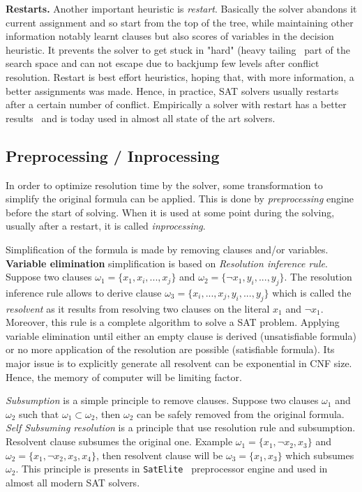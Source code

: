 \textbf{Restarts.}
Another important heuristic is \emph{restart}. Basically the solver abandons it current assignment and so 
start from the top of the tree, while maintaining other information notably learnt clauses but also scores of variables in the decision heuristic. It prevents the solver to get stuck in "hard" (heavy tailing~\cite{gomes1997heavy} part of the search space and can not escape due to backjump few levels after conflict resolution. Restart is best effort heuristics, hoping that,
with more information, a better assignments was made. Hence, in practice, SAT solvers usually restarts after a
certain number of conflict. Empirically a solver with restart has a better results~\cite{huang2007effect} and is today
used in almost all state of the art solvers.


\subsection{Preprocessing / Inprocessing}

In order to optimize resolution time by the solver, some transformation to simplify the original formula can be applied. This is done by \emph{preprocessing} engine before the start of solving. When it is used at some point during the solving, usually after a restart, it is called \emph{inprocessing}.

Simplification of the formula is made by removing clauses and/or variables.\\
\textbf{Variable elimination} simplification is based on \emph{Resolution inference rule}.
Suppose two clauses	$\omega_1 = \{x_1, x_i, ..., x_j \}$ and $\omega_2 = \{\neg x_1, y_i, ..., y_j\}$.
The resolution inference rule allows to derive clause $\omega_3 = \{x_i, ..., x_j, y_i, ..., y_j\}$ which is called
the \emph{resolvent} as it results from resolving two clauses on the literal $x_1$ and $\neg x_1$.
Moreover, this rule is a complete algorithm to solve a SAT problem. Applying variable elimination until either an empty clause is derived (unsatisfiable formula) or no more application of the resolution are
possible (satisfiable formula). Its major issue is to explicitly generate all resolvent can be exponential in CNF size. Hence, the memory of computer will be limiting factor.


\emph{Subsumption} is a simple principle to remove clauses. Suppose two clauses $\omega_1$ and $\omega_2$ such that
$\omega_1 \subset  \omega_2$, then $\omega_2$ can be safely removed from the original formula.
\emph{Self Subsuming resolution} is a principle that use resolution rule and subsumption.
Resolvent clause subsumes the original one. Example $\omega_1 = \{x_1, \neg x_2, x_3\}$ and $\omega_2 = \{x_1, \neg x_2, x_3, x_4\}$, then resolvent clause will be $\omega_3 = \{x_1, x_3\}$ which subsumes $\omega_2$. This principle
is presents in \texttt{SatElite}~\cite{een2005effective} preprocessor engine and used in almost all modern SAT solvers.

